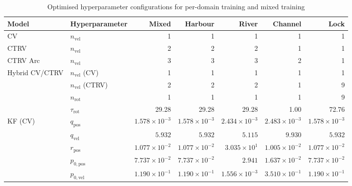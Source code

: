             \begin{table}[h]
            \centering
            \caption{Optimised hyperparameter configurations for per-domain training and mixed training} 
            \label{tab:hpo_results_merged}
            \small
            \setlength{\tabcolsep}{3pt}
            \begin{tabular}{llrrrrr}
            \toprule
            \textbf{Model} & \textbf{Hyperparameter} & \textbf{Mixed} & \textbf{Harbour} & \textbf{River} & \textbf{Channel} & \textbf{Lock} \\
            \midrule
            CV             & $n_\text{vel}$        & 1      & 1     & 1     & 1     & 1     \\
            CTRV           & $n_\text{vel}$        & 2      & 2     & 2     & 1     & 1     \\
            CTRV Arc       & $n_\text{vel}$        & 3      & 3     & 3     & 2     & 1     \\
            Hybrid CV/CTRV & $n_\text{vel}$ (CV)   & 1      & 1     & 1     & 1     & 1     \\
                           & $n_\text{vel}$ (CTRV) & 2      & 2     & 2     & 1     & 9     \\
                           & $n_\text{rot}$        & 1      & 1     & 1     & 1     & 9     \\
                           & $\tau_\text{rot}$     & 29.28  & 29.28 & 29.28 & 1.00  & 72.76 \\
            \midrule
            KF (CV)        & $q_\text{pos}$        & $1.578 \times 10^{-3}$ & $1.578 \times 10^{-3}$ & $2.434 \times 10^{-3}$ & $2.483 \times 10^{-3}$ & $1.578 \times 10^{-3}$ \\
                           & $q_\text{vel}$        & $5.932$                & $5.932$                & $5.115$                & $9.930$                & $5.932$                \\
                           & $r_\text{pos}$        & $1.077 \times 10^{-2}$ & $1.077 \times 10^{-2}$ & $3.035 \times 10^{1}$  & $1.005 \times 10^{-2}$ & $1.077 \times 10^{-2}$ \\
                           & $p_{0,\text{pos}}$    & $7.737 \times 10^{-2}$ & $7.737 \times 10^{-2}$ & $2.941$                & $1.637 \times 10^{-2}$ & $7.737 \times 10^{-2}$ \\
                           & $p_{0,\text{vel}}$    & $1.190 \times 10^{-1}$ & $1.190 \times 10^{-1}$ & $1.556 \times 10^{-3}$ & $3.510 \times 10^{-1}$ & $1.190 \times 10^{-1}$ \\

\end{tabular}
\end{table}
